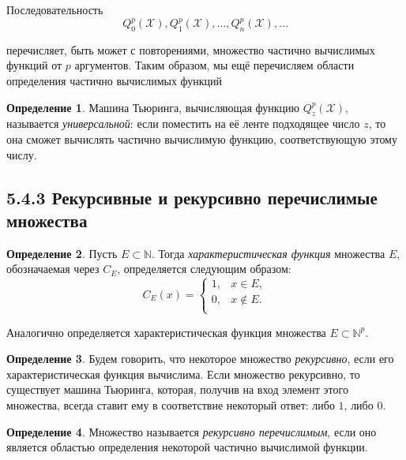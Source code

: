 \documentclass[a4paper, 12pt]{article}  %
\theoremstyle{definition}
\newtheorem*{theorem}{Теорема}
\newtheorem*{definition}{Определение}
\begin{document}
		Последовательность
		$$Q^p_0(\mathscr{X}), Q^p_1(\mathscr{X}), \dots, Q^p_n(\mathscr{X}), \dots$$
		
		перечисляет, быть может с повторениями, множество частично вычислимых функций от $p$ аргументов.
		Таким образом, мы ещё перечисляем области определения частично вычислимых функций 
		
		\begin{definition}
			Машина Тьюринга, вычисляющая функцию $Q^p_z(\mathscr{X})$, называется \textit{универсальной}:
			если поместить на её ленте подходящее число $z$, то она сможет вычислять частично вычислимую
			функцию, соответствующую этому числу.
		\end{definition}
		
		
		
		
	\subsection*{5.4.3 Рекурсивные и рекурсивно перечислимые множества}
	
		\begin{definition}
			Пусть $E \subset \mathbb{N}$. Тогда \textit{характеристическая функция} множества $E$, обозначаемая через $C_E$, определяется следующим образом:
			\[
				C_E(x) =  
					\begin{cases}
						1, & x \in E, \\
						0, & x \notin E. \\
					\end{cases}
			\]			
			
			Аналогично определяется характеристическая функция множества $E \subset \mathbb{N}^p$.
		\end{definition}
	
		\begin{definition}
			Будем говорить, что некоторое множество \textit{рекурсивно}, если его характеристическая
			функция вычислима. Если множество рекурсивно, то существует машина Тьюринга, которая, получив
			на вход элемент этого множества, всегда ставит ему в соответствие некоторый ответ: либо $1$,
			либо $0$.
		\end{definition}
	
		\begin{definition}
			Множество называется \textit{рекурсивно перечислимым}, если оно является областью определения
			некоторой частично вычислимой функции.
		\end{definition}
	
\end{document}

